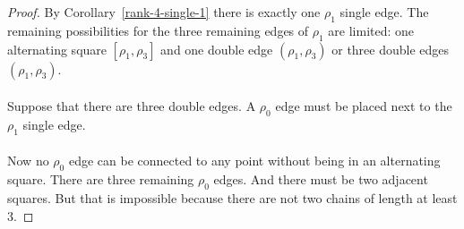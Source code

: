 \begin{proof}
  By Corollary~\ref{rank-4-single-1} there is exactly one $\rho_1$ single edge. The remaining possibilities for the three remaining edges of $\rho_1$ are limited: one alternating square $[\rho_1, \rho_3]$ and one double edge $(\rho_1, \rho_3)$ or three double edges $(\rho_1, \rho_3)$.

  \paragraph{}
  Suppose that there are three double edges. A $\rho_0$ edge must be placed next to the $\rho_1$ single edge.

    \begin{figure}[H]
      \begin{center}
        \caption{}
      \end{center}
    \end{figure}

  \paragraph{}
  Now no $\rho_0$ edge can be connected to any point without being in an alternating square. There are three remaining $\rho_0$ edges. And there must be two adjacent squares. But that is impossible because there are not two chains of length at least 3.
\end{proof}
